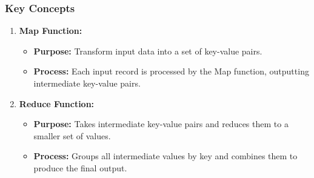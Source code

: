 \documentclass[aspectratio=169]{beamer}
\begin{document}
\begin{frame}[fragile]
  \frametitle{Key Concepts}
  \begin{enumerate}
    \item \textbf{Map Function:}
    \begin{itemize}
      \item \textbf{Purpose:} Transform input data into a set of key-value pairs.
      \item \textbf{Process:} Each input record is processed by the Map function, outputting intermediate key-value pairs.
    \end{itemize}
    
    \pause
    
    \item \textbf{Reduce Function:}
    \begin{itemize}
      \item \textbf{Purpose:} Takes intermediate key-value pairs and reduces them to a smaller set of values.
      \item \textbf{Process:} Groups all intermediate values by key and combines them to produce the final output.
    \end{itemize}
  \end{enumerate}
\end{frame}
\end{document}
